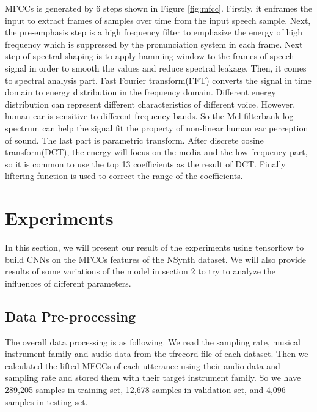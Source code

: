 \documentclass{article}
\begin{document}
MFCCs is generated by 6 steps shown in Figure \ref{fig:mfcc}. Firstly, it enframes the input to extract frames of samples over time from the input speech sample. Next, the pre-emphasis step is a high frequency filter to emphasize the energy of high frequency which is suppressed by the pronunciation system in each frame. Next step of spectral shaping is to apply hamming window to the frames of speech signal in order to smooth the values and reduce spectral leakage. Then, it comes to spectral analysis part. Fast Fourier transform(FFT) converts the signal in time domain to energy distribution in the frequency domain. Different energy distribution can represent different characteristics of different voice. However, human ear is sensitive to different frequency bands. So the Mel filterbank log spectrum can help the signal fit the property of non-linear human ear perception of sound. The last part is parametric transform. After discrete cosine transform(DCT), the energy will focus on the media and the low frequency part, so it is common to use the top 13 coefficients as the result of DCT. Finally liftering function is used to correct the range of the coefficients.



\section{Experiments}

In this section, we will present our result of the experiments using tensorflow to build CNNs on the MFCCs features of the NSynth dataset. We will also provide results of some variations of the model in section 2 to try to analyze the influences of different parameters.

\subsection{Data Pre-processing}

The overall data processing is as following. We read the sampling rate, musical instrument family and audio data from the tfrecord file of each dataset. Then we calculated the lifted MFCCs of each utterance using their audio data and sampling rate and stored them with their target instrument family. So we have 289,205 samples in training set, 12,678 samples in validation set, and 4,096 samples in testing set.
\end{document}
